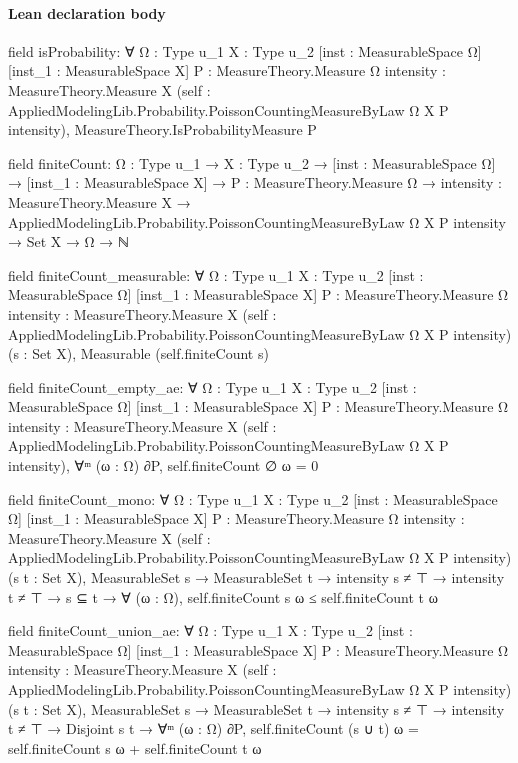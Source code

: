 \documentclass[10pt]{article}
\begin{document}
\paragraph{Lean declaration body}
\begin{ReviewVerbatim}
field isProbability:
∀ {Ω : Type u_1} {X : Type u_2} [inst : MeasurableSpace Ω] [inst_1 : MeasurableSpace X] {P : MeasureTheory.Measure Ω}
  {intensity : MeasureTheory.Measure X}
  (self : AppliedModelingLib.Probability.PoissonCountingMeasureByLaw Ω X P intensity),
  MeasureTheory.IsProbabilityMeasure P

field finiteCount:
{Ω : Type u_1} →
  {X : Type u_2} →
    [inst : MeasurableSpace Ω] →
      [inst_1 : MeasurableSpace X] →
        {P : MeasureTheory.Measure Ω} →
          {intensity : MeasureTheory.Measure X} →
            AppliedModelingLib.Probability.PoissonCountingMeasureByLaw Ω X P intensity → Set X → Ω → ℕ

field finiteCount_measurable:
∀ {Ω : Type u_1} {X : Type u_2} [inst : MeasurableSpace Ω] [inst_1 : MeasurableSpace X] {P : MeasureTheory.Measure Ω}
  {intensity : MeasureTheory.Measure X}
  (self : AppliedModelingLib.Probability.PoissonCountingMeasureByLaw Ω X P intensity) (s : Set X),
  Measurable (self.finiteCount s)

field finiteCount_empty_ae:
∀ {Ω : Type u_1} {X : Type u_2} [inst : MeasurableSpace Ω] [inst_1 : MeasurableSpace X] {P : MeasureTheory.Measure Ω}
  {intensity : MeasureTheory.Measure X}
  (self : AppliedModelingLib.Probability.PoissonCountingMeasureByLaw Ω X P intensity),
  ∀ᵐ (ω : Ω) ∂P, self.finiteCount ∅ ω = 0

field finiteCount_mono:
∀ {Ω : Type u_1} {X : Type u_2} [inst : MeasurableSpace Ω] [inst_1 : MeasurableSpace X] {P : MeasureTheory.Measure Ω}
  {intensity : MeasureTheory.Measure X}
  (self : AppliedModelingLib.Probability.PoissonCountingMeasureByLaw Ω X P intensity) (s t : Set X),
  MeasurableSet s →
    MeasurableSet t → intensity s ≠ ⊤ → intensity t ≠ ⊤ → s ⊆ t → ∀ (ω : Ω), self.finiteCount s ω ≤ self.finiteCount t ω

field finiteCount_union_ae:
∀ {Ω : Type u_1} {X : Type u_2} [inst : MeasurableSpace Ω] [inst_1 : MeasurableSpace X] {P : MeasureTheory.Measure Ω}
  {intensity : MeasureTheory.Measure X}
  (self : AppliedModelingLib.Probability.PoissonCountingMeasureByLaw Ω X P intensity) (s t : Set X),
  MeasurableSet s →
    MeasurableSet t →
      intensity s ≠ ⊤ →
        intensity t ≠ ⊤ →
          Disjoint s t → ∀ᵐ (ω : Ω) ∂P, self.finiteCount (s ∪ t) ω = self.finiteCount s ω + self.finiteCount t ω


\end{ReviewVerbatim}
\end{document}
